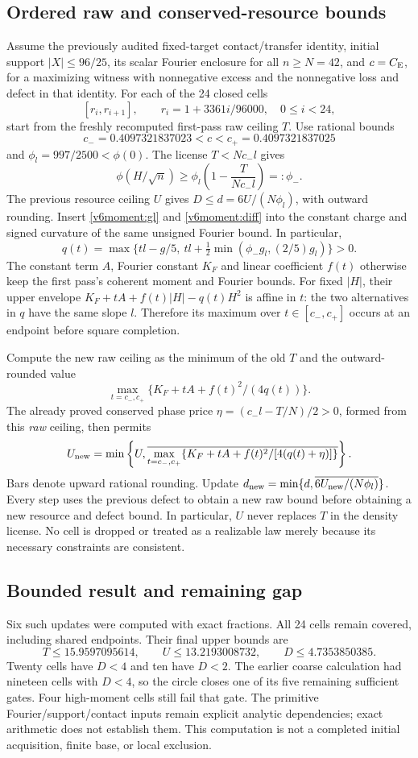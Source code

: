 \subsection{Ordered raw and conserved-resource bounds}
\label{v6moment:update}
Assume the previously audited fixed-target contact/transfer identity,
initial support $|X|\le96/25$, its scalar Fourier enclosure for all
$n\ge N=42$, and $c=C_{\rm E}$, for a maximizing witness with
nonnegative excess and the nonnegative loss and defect in that identity.
For each of the 24 closed cells
\[
 [r_i,r_{i+1}],\qquad r_i=1+3361i/96000,\quad0\le i<24,
\]
start from the freshly recomputed first-pass raw ceiling $T$.
Use rational bounds
\[
 c_-=0.4097321837023<c<c_+=0.4097321837025
\]
and
$\phi_l=997/2500<\phi(0)$. The license $T<Nc_-l$ gives
\[
 \phi(H/\sqrt n)\ge\phi_l\left(1-\frac{T}{Nc_-l}\right)=:\phi_-.
\]
The previous resource ceiling $U$ gives $D\le d=6U/(N\phi_l)$,
with outward rounding. Insert \eqref{v6moment:gl} and
\eqref{v6moment:diff} into the constant charge and signed curvature
of the same unsigned Fourier bound. In particular,
\[
 q(t)=\max\{tl-g/5,\ tl+\tfrac12\min(\phi_-g_l,(2/5)g_l)\}>0.
\]
The constant term $A$, Fourier constant $K_F$ and linear coefficient
$f(t)$ otherwise keep the first pass's coherent moment and Fourier bounds.
For fixed $|H|$, their upper envelope
$K_F+tA+f(t)|H|-q(t)H^2$ is affine in $t$: the two alternatives
in $q$ have the same slope $l$. Therefore its maximum over
$t\in[c_-,c_+]$ occurs at an endpoint before square completion.

Compute the new raw ceiling as the minimum of the old $T$ and the
outward-rounded value
\[
 \max_{t=c_-,c_+}\{K_F+tA+f(t)^2/(4q(t))\}.
\]
The already proved conserved phase price
$\eta=(c_-l-T/N)/2>0$, formed from this \emph{raw} ceiling, then permits
\[
 U_{\rm new}=\min\left\{U,
 \overline{\max_{t=c_-,c_+}
 \{K_F+tA+f(t)^2/[4(q(t)+\eta)]\}}\right\}.
\]
Bars denote upward rational rounding. Update
$d_{\rm new}=\min\{d,\overline{6U_{\rm new}/(N\phi_l)}\}$.
Every step uses the previous defect to obtain a new raw bound before
obtaining a new resource and defect bound. In particular, $U$ never
replaces $T$ in the density license. No cell is dropped or treated as a
realizable law merely because its necessary constraints are consistent.

\subsection{Bounded result and remaining gap}
Six such updates were computed with exact fractions. All 24 cells remain
covered, including shared endpoints. Their final upper bounds are
\[
 T\le15.9597095614,\qquad U\le13.2193008732,
 \qquad D\le4.7353850385.
\]
Twenty cells have $D<4$ and ten have $D<2$. The earlier coarse calculation
had nineteen cells with $D<4$, so the circle closes one of its five
remaining sufficient gates. Four high-moment cells still fail that gate.
The primitive Fourier/support/contact inputs remain explicit analytic
dependencies; exact arithmetic does not establish them. This computation
is not a completed initial acquisition, finite base, or local exclusion.
